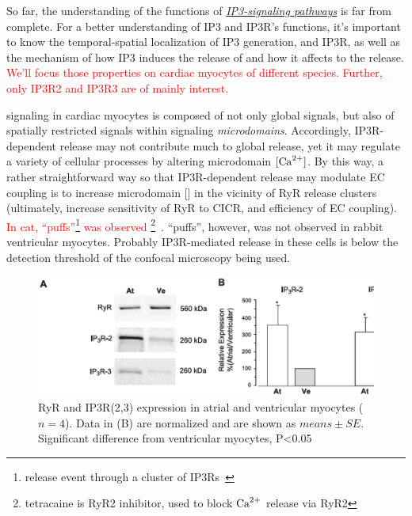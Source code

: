 So far, the understanding of the functions of
\hyperref[sec:ip3-pathways]{\it IP3-signaling pathways} is far from
complete.  For a better understanding of IP3 and IP3R's functions,
it's important to know the temporal-spatial localization of IP3
generation, and IP3R, as well as the mechanism of how IP3 induces the
release of  and how it affects to the release.
\textcolor{red}{We'll focus those properties on cardiac myocytes of
  different species. Further, only IP3R2 and IP3R3 are of mainly
  interest.}



 signaling in cardiac myocytes is composed of not only
global  signals, but also of spatially restricted 
signals within signaling {\it microdomains}.  Accordingly,
IP3R-dependent  release may not contribute much to global
 release, yet it may regulate a variety of cellular
processes by altering microdomain $[\ce{Ca^2+}]$. By this way, a
rather straightforward way so that IP3R-dependent  release
may modulate EC coupling is to increase microdomain [] in
the vicinity of RyR release clusters (ultimately, increase sensitivity
of RyR to CICR, and efficiency of EC coupling).
\textcolor{red}{In cat, 
  ``puffs''\footnote{ release event through
    a cluster of IP3Rs~\citep{yao1995qpi}} was observed}
  \footnote{tetracaine is RyR2 inhibitor, used to block ${\text{Ca}^{2+}}$ release via
  RyR2}~\citep{zima2004ip3}.
 ``puffs'', however, was not observed in rabbit ventricular
myocytes.  Probably IP3R-mediated  release in these cells is
below the detection threshold of the confocal microscopy being used.



\begin{figure}[hbt]
  \centerline{\includegraphics[height=4cm]{./images/RyR_IP3R_expression.eps}}
\caption{RyR and IP3R(2,3) expression in atrial and ventricular
  myocytes ($n=4$). Data in (B) are normalized and are shown as $means\pm
  SE$. Significant difference from ventricular myocytes, P<0.05}
\label{fig:RyR_IP3R_expression}
\end{figure}

